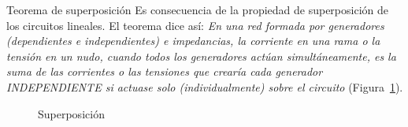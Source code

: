 \documentclass[11pt]{book} %
\makeatletter
\numberwithin{dummy}{section}
\theoremstyle{ocrenumbox}
\theoremstyle{blacknumex}
\theoremstyle{blacknumbox}
\theoremstyle{ocrenum}
\renewcommand{\subsection}{\@startsection {subsection}{2}{\z@}
{-3ex \@plus -0.1ex \@minus -.4ex}
{0.5ex \@plus.2ex }
{\normalfont\sffamily\bfseries}}
\newlength\esp
\makeatother
\begin{document}
    \subsection{Teorema de superposición}
    Es consecuencia de la propiedad de superposición de los circuitos lineales. El teorema dice así: \textit{En una red formada por generadores (dependientes e independientes) e impedancias, la corriente en una rama o la tensión en un  nudo, cuando todos los generadores actúan simultáneamente, es la suma de las corrientes o las tensiones que crearía cada generador INDEPENDIENTE si actuase solo (individualmente) sobre el circuito} (Figura~\ref{fig.superposicion}).
    \begin{figure}[htbp]
        \centering
        \hfil
        \caption{Superposición}
        \label{fig.superposicion}
    \end{figure}
    
\end{document}
